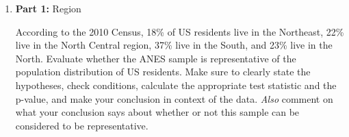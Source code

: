 \documentclass[11pt]{article}
\newcommand{\soln}[1]{}
\begin{document}
\begin{enumerate}

\item \textbf{Part 1:} Region

According to the 2010 Census, 18\% of US residents live in the Northeast, 22\% live in the North Central region, 37\% live in the South, and 23\% live in the North. Evaluate whether the ANES sample is representative of the population distribution of US residents. Make sure to clearly state the hypotheses, check conditions, calculate the appropriate test statistic and the p-value, and make your conclusion in context of the data. \emph{Also} comment on what your conclusion says about whether or not this sample can be considered to be representative.

\soln{$H_0$: The sample distribution of regions follows the census distribution. \\
$H_A$: The sample distribution of regions does not follow the census distribution.
\begin{itemize}
\item Independence:
\begin{itemize}
\item 500 $<$ 10\% of US population
\item Sample is random
\item Each person in the sample is only in one cell
\end{itemize}
\item Sample size: \\
$E_{NE}  500 \times 0.18 = 90$ $\qquad$ $E_{NC}  500 \times 0.22 = 110$ \\
$E_{S}  500 \times 0.37 = 185$ $\qquad$ $E_{W}  500 \times 0.23 = 115$ \\
All expected counts are greater than 5.
\end{itemize}
$\chi^2 = \frac{(83 - 90)^2}{90} + \frac{(121 - 110)^2}{110} + \frac{(193 - 185)^2}{185} + \frac{(103 - 115)^2}{115} \approx 3.24$ \\
$df = 4 - 1 = 3$ \\
$p-value > 0.3$ \\
p-value is large so we fail to reject $H_0$, \\
the data do not provide convincing evidence that the sample distribution of regions does not follow the census distribution. \\
The sample is likely representative since the distribution of sampled individual matches the distribution regional population distribution.
}


\end{enumerate}
\end{document}
